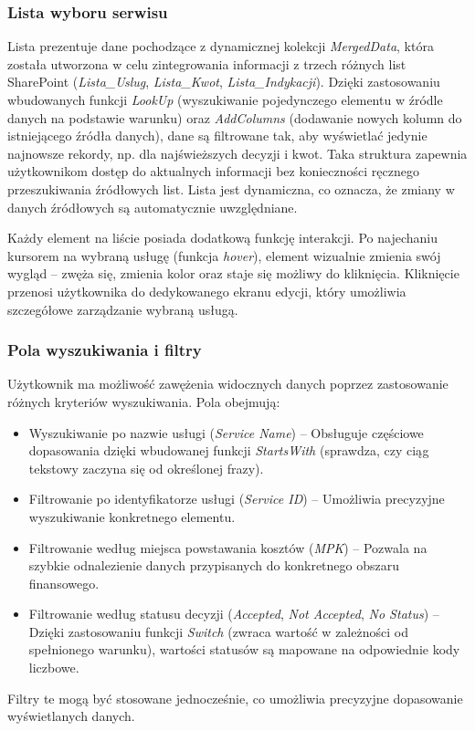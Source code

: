\subsubsection*{Lista wyboru serwisu}
Lista prezentuje dane pochodzące z dynamicznej kolekcji \textit{MergedData}, która została utworzona w celu zintegrowania informacji z trzech różnych list SharePoint (\textit{Lista\_Uslug}, \textit{Lista\_Kwot}, \textit{Lista\_Indykacji}). Dzięki zastosowaniu wbudowanych funkcji \textit{LookUp} (wyszukiwanie pojedynczego elementu w źródle danych na podstawie warunku) oraz \textit{AddColumns} (dodawanie nowych kolumn do istniejącego źródła danych), dane są filtrowane tak, aby wyświetlać jedynie najnowsze rekordy, np. dla najświeższych decyzji i kwot. Taka struktura zapewnia użytkownikom dostęp do aktualnych informacji bez konieczności ręcznego przeszukiwania źródłowych list. Lista jest dynamiczna, co oznacza, że zmiany w danych źródłowych są automatycznie uwzględniane.

Każdy element na liście posiada dodatkową funkcję interakcji. Po najechaniu kursorem na wybraną usługę (funkcja \textit{hover}), element wizualnie zmienia swój wygląd -- zwęża się, zmienia kolor oraz staje się możliwy do kliknięcia. Kliknięcie przenosi użytkownika do dedykowanego ekranu edycji, który umożliwia szczegółowe zarządzanie wybraną usługą.

\subsubsection*{Pola wyszukiwania i filtry}
Użytkownik ma możliwość zawężenia widocznych danych poprzez zastosowanie różnych kryteriów wyszukiwania. Pola obejmują:
\begin{itemize}
    \item {Wyszukiwanie po nazwie usługi (\textit{Service Name})} -- Obsługuje częściowe dopasowania dzięki wbudowanej funkcji \textit{StartsWith} (sprawdza, czy ciąg tekstowy zaczyna się od określonej frazy).
    \item {Filtrowanie po identyfikatorze usługi (\textit{Service ID})} -- Umożliwia precyzyjne wyszukiwanie konkretnego elementu.
    \item {Filtrowanie według miejsca powstawania kosztów (\textit{MPK})} -- Pozwala na szybkie odnalezienie danych przypisanych do konkretnego obszaru finansowego.
    \item {Filtrowanie według statusu decyzji (\textit{Accepted}, \textit{Not Accepted}, \textit{No Status})} -- Dzięki zastosowaniu funkcji \textit{Switch} (zwraca wartość w zależności od spełnionego warunku), wartości statusów są mapowane na odpowiednie kody liczbowe.
\end{itemize}
Filtry te mogą być stosowane jednocześnie, co umożliwia precyzyjne dopasowanie wyświetlanych danych.

